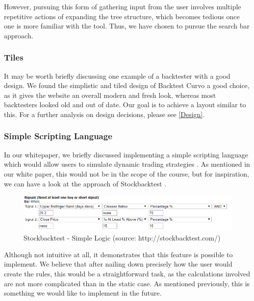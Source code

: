 \documentclass[main.tex]{subfiles}
\begin{document}
However, pursuing this form of gathering input from the user involves multiple repetitive actions of expanding the tree structure, which becomes tedious once one is more familiar with the tool. Thus, we have chosen to pursue the search bar approach.


\subsubsection*{Tiles}

It may be worth briefly discussing one example of a backtester with a good design. We found the simplistic and tiled design of Backtest Curvo \cite{backtestcurvo} a good choice, as it gives the website an overall modern and fresh look, whereas most backtesters looked old and out of date. Our goal is to achieve a layout similar to this. For a further analysis on design decisions, please see \ref{Design}.

\subsubsection*{Simple Scripting Language}

In our whitepaper, we briefly discussed implementing a simple scripting language which would allow users to simulate dynamic trading strategies \cite{WP}. As mentioned in our white paper, this would not be in the scope of the course, but for inspiration, we can have a look at the approach of Stockbacktest \cite{stockbacktest}.

\begin{figure}[H]
   \centering
   \includegraphics[scale=0.7]{02Background/02Pictures/stockbacktest.png}
   \caption{Stockbacktest - Simple Logic (source: http://stockbacktest.com/)}
\end{figure}

Although not intuitive at all, it demonstrates that this feature is possible to implement. We believe that after nailing down precisely how the user would create the rules, this would be a straightforward task, as the calculations involved are not more complicated than in the static case. As mentioned previously, this is something we would like to implement in the future.
\end{document}
